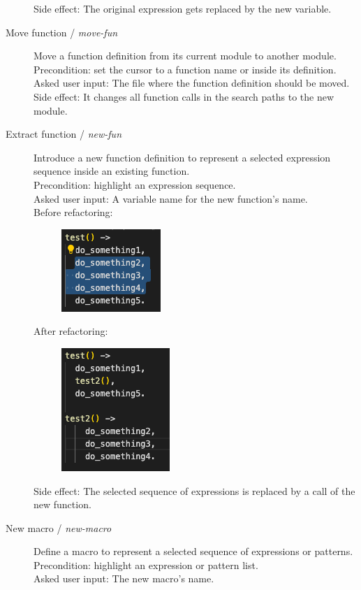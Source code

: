 \begin{description}
\begin{figure}[H]
    \end{figure}
	Side effect: The original expression gets replaced by the new variable.
	\item[Move function / \textit{move-fun}] Move a function definition from its current module to another module.
	\\Precondition: set the cursor to a function name or inside its definition.
	\\Asked user input: The file where the function definition should be moved. 
	Side effect: It changes all function calls in the search paths to the new module.
	\item[Extract function / \textit{new-fun}] Introduce a new function definition to represent a selected expression sequence inside an existing function. 
	\\Precondition: highlight an expression sequence.
	\\Asked user input: A variable name for the new function's name. 
	\\Before refactoring:
	\begin{figure}[H]
	\centering
	\includegraphics[]{images/extract_before.png}
    \end{figure}
	After refactoring:
	\begin{figure}[H]
	\centering
	\includegraphics[]{images/extract_after.png}
    \end{figure}
	Side effect: The selected sequence of expressions is replaced by a call of the new function.
	\item[New macro / \textit{new-macro}] Define a macro to represent a selected sequence of expressions or patterns.
	\\Precondition: highlight an expression or pattern list.
	\\Asked user input: The new macro's name. 

\end{description}
